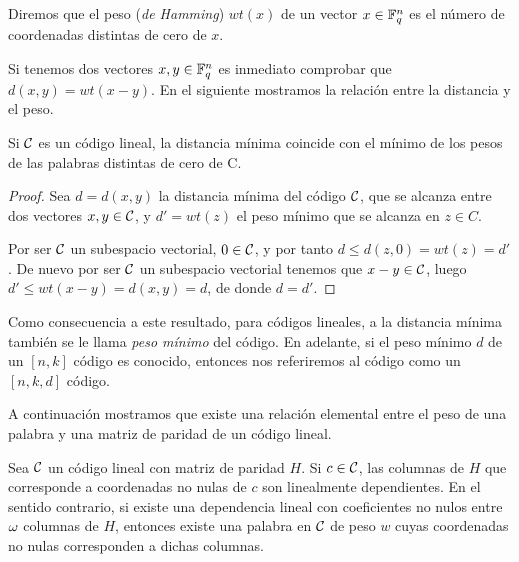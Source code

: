 \begin{definition}
Diremos que el peso (\textit{de Hamming}) \(wt(x)\) de un vector \(x \in \mathbb{F}_q^n\) es el número de coordenadas distintas de cero de \(x\).
\end{definition}

Si tenemos dos vectores \(x, y \in \mathbb{F}_q^n\) es inmediato comprobar que \(d(x,y) = wt(x - y)\). En el siguiente mostramos la relación entre la distancia y el peso.

\begin{proposition}
Si \(\mathcal{C}\) es un  código lineal, la distancia mínima coincide con el mínimo de los pesos de las palabras distintas de cero de C.

\begin{proof}
Sea \(d = d(x,y)\) la distancia mínima del código \(\mathcal{C}\), que se alcanza entre dos vectores \(x, y \in \mathcal{C}\), y \(d' = wt(z)\) el peso mínimo que se alcanza en \(z \in C\).

Por ser \(\mathcal{C}\) un subespacio vectorial,  \(0 \in \mathcal{C}\), y por tanto  \(d \leq d(z, 0) = wt(z) = d'\). De nuevo por ser \(\mathcal{C}\) un subespacio vectorial tenemos que \(x-y \in \mathcal{C}\), luego \(d' \leq wt(x-y) = d(x,y) = d\), de donde \(d = d'\).
\end{proof}
\end{proposition}

Como consecuencia a este resultado, para códigos lineales, a la distancia mínima también se le llama \textit{peso mínimo} del código. En adelante, si el peso mínimo \(d\) de un \([n,k]\) código es conocido, entonces nos referiremos al código como un \([n,k,d]\) código.

A continuación mostramos que existe una relación elemental entre el peso de una palabra y una matriz de paridad de un código lineal.

\begin{proposition}
    Sea \(\mathcal{C}\) un código lineal con matriz de paridad \(H\). Si \(c \in \mathcal{C}\), las columnas de \(H\) que corresponde a coordenadas no nulas de \(c\) son linealmente dependientes. En el sentido contrario, si existe una dependencia lineal con coeficientes no nulos entre \(\omega\) columnas de  \(H\), entonces existe una palabra en \(\mathcal{C}\) de peso \(w\) cuyas coordenadas no nulas corresponden a dichas columnas.
\end{proposition}

